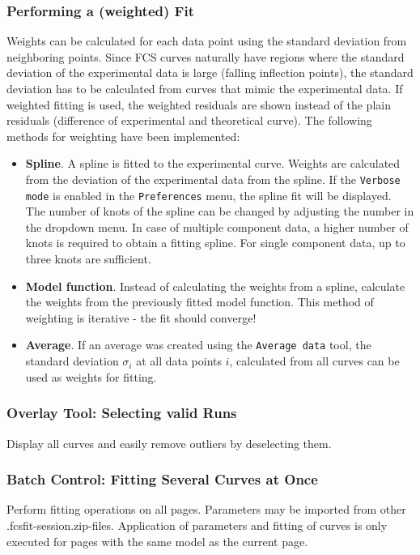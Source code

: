 \subsubsection{Performing a (weighted) Fit}
Weights can be calculated for each data point using the standard deviation from neighboring points. Since FCS curves naturally have regions where the standard deviation of the experimental data is large (falling inflection points), the standard deviation has to be calculated from curves that mimic the experimental data. If weighted fitting is used, the weighted residuals are shown instead of the plain residuals (difference of experimental and theoretical curve). The following methods for weighting have been implemented:
\begin{itemize}
\item[] \textbf{Spline}. A spline is fitted to the experimental curve. Weights are calculated from the deviation of the experimental data from the spline. If  the \texttt{Verbose mode} is enabled in  the \texttt{Preferences} menu, the spline fit will be displayed. The number of knots of the spline can be changed by adjusting the number in the dropdown menu. In case of multiple component data, a higher number of knots is required to obtain a fitting spline. For single component data, up to three knots are sufficient.
\item[] \textbf{Model function}. Instead of calculating the weights from a spline, calculate the weights from the previously fitted model function. This method of weighting is iterative - the fit should converge!
\item[] \textbf{Average}. If an average was created using the \texttt{Average data} tool, the standard deviation $\sigma_i$ at all data points $i$, calculated from all curves can be used as weights for fitting. 
\end{itemize}


\subsubsection{Overlay Tool: Selecting valid Runs} 
Display all curves and easily remove outliers by deselecting them.

\subsubsection{Batch Control: Fitting Several Curves at Once}
Perform fitting operations on all pages. Parameters may be imported from other \mytilde .fcsfit-session.zip-files. Application of parameters and fitting of curves is only executed for pages with the same model as the current page.


